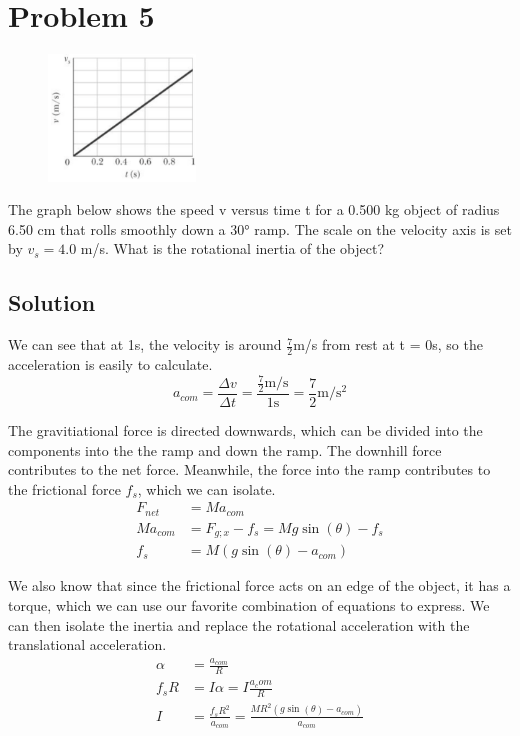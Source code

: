 \documentclass[12pt]{article}
\begin{document}
\section{Problem 5}
\begin{figure}
    \vspace{-50pt}
    \includegraphics[width=0.35\textwidth]{graph_5.png} 
\end{figure}
The graph below shows the speed v versus time t for a 0.500 kg object of radius 6.50 cm that rolls smoothly down a 30\unit{\degree} ramp. The scale on the velocity axis is set by $v_s = 4.0$ m/s. What is the rotational inertia of the object?

\subsection{Solution}
We can see that at 1s, the velocity is around $\frac{7}{2}$m/s from rest at t = 0s, so the acceleration is easily to calculate.
\begin{equation}
    a_{com} =   \frac{\Delta v}{\Delta t} 
        = \frac{\frac{7}{2}\unit{\meter/\second}}{1\unit{\second}} 
        = \frac{7}{2}\unit{\meter/\second^2}
\end{equation}

The gravitiational force is directed downwards, which can be divided into the components into the the ramp and down the ramp. The downhill force contributes to the net force. Meanwhile, the force into the ramp contributes to the frictional force $f_s$, which we can isolate.
\begin{align}
    F_{net} &=  Ma_{com}\\
    Ma_{com}    &=  F_{g;x} - f_s
        =   Mg\sin(\theta) - f_s\\
    f_s &=  M(g\sin(\theta) - a_{com})
\end{align}

We also know that since the frictional force acts on an edge of the object, it has a torque, which we can use our favorite combination of equations to express. We can then isolate the inertia and replace the rotational acceleration with the translational acceleration.
\begin{align}
    \alpha  &=  \frac{a_{com}}{R}\\
    f_s R   &=  I\alpha
        =   I\frac{a_com}{R}\\
    I   &=  \frac{f_s R^2}{a_{com}}
        =   \frac{MR^2(g\sin(\theta) - a_{com})}{a_{com}}
\end{align}
\end{document}
